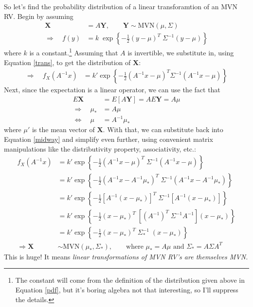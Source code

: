 \documentclass[a4paper,12pt]{scrartcl}
\begin{document}
So let's find the probability distribution of a linear transforamtion
of an MVN RV. Begin by assuming 
\begin{align*}
    \mathbf{X} &= A\mathbf{Y}, \qquad \mathbf{Y} \sim 
	\text{MVN}(\mu, \Sigma) \\
    \Rightarrow \quad f(y) &= k \; \exp\left\{-\frac{1}{2} (y - \mu)^T 
	\; \Sigma^{-1} (y-\mu)\right\}
\end{align*}
where $k$ is a constant.\footnote{The constant will come from the
definition of the distribution given above in Equation \ref{pdf}, but
it's boring algebra not that interesting, so I'll suppress the details.}
Assuming that $A$ is invertible, we substitute in, using Equation 
\ref{trans}, to get the distribution of $\mathbf{X}$:
\begin{align}
    \label{midway}
    \Rightarrow \quad f_X(A^{-1}x) &= k' \exp\left\{-\frac{1}{2} (A^{-1}x - \mu)^T 
	\Sigma^{-1} (A^{-1}x-\mu)\right\} 
\end{align}
Next, since the expectation is a linear operator, we can use the fact
that 
\begin{align*}
    E\mathbf{X} &= E[A\mathbf{Y}] = A E\mathbf{Y} = A \mu \\
    \Rightarrow \quad \mu_* &= A \mu \\
    \Leftrightarrow \quad \mu &= A^{-1} \mu_*
\end{align*}
where $\mu'$ is the mean vector of $\mathbf{X}$.  With that, we
can substitute back into Equation \ref{midway} and simplify even
further, using convenient matrix manipulations like the distributivity
property, associativity, etc.:
\begin{align*}
    f_X(A^{-1}x) &= k' \exp\left\{-\frac{1}{2} (A^{-1}x - \mu)^T \;
	\Sigma^{-1} (A^{-1}x-\mu)\right\} \\
    &= k' \exp\left\{-\frac{1}{2} (A^{-1}x - A^{-1}\mu_*)^T \;
	\Sigma^{-1} (A^{-1}x-A^{-1}\mu_*)\right\} \\
    &= k' \exp\left\{-\frac{1}{2} [A^{-1}(x - \mu_*)]^T \;
	\Sigma^{-1} [A^{-1}(x-\mu_*)]\right\} \\
    &= k' \exp\left\{-\frac{1}{2} (x - \mu_*)^T \; [(A^{-1})^T \;
	\Sigma^{-1} A^{-1}] (x-\mu_*)\right\} \\
    &= k' \exp\left\{-\frac{1}{2} (x - \mu_*)^T \;  
	\Sigma_*^{-1} \; (x-\mu_*)\right\} \\
    \Rightarrow \mathbf{X} &\sim  \text{MVN}(\mu_*, \Sigma_*), 
    \qquad \text{where $\mu_* = A\mu$ and $\Sigma_* = A\Sigma A^T $}
\end{align*}
This is huge! It means \emph{linear transformations of MVN
RV's are themselves MVN.}
\end{document}
